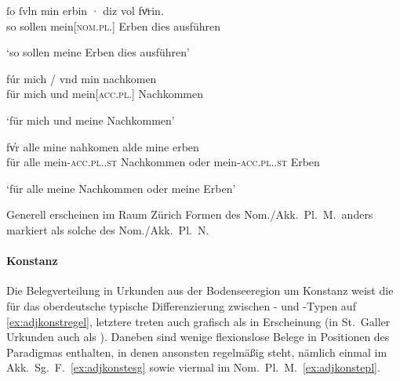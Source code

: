 \begin{exe}
\ex \label{ex:adjzuer0}
	\begin{xlist}
	\ex \label{ex:adjzuer0_1}
		\gll ſo ſvln min erbin · diz {vol fvͦrin.} \\
			so sollen mein[\textsc{nom.pl.\MascA}] Erben {} dies ausführen \\
		\begin{taggedline}{\parencites(Zürich, 1251)[\pno~19,~28.20]{cao1}}
		\trans `so sollen meine Erben dies ausführen'
		\end{taggedline}

	\ex \label{ex:adjzuer0_2}
		\gll fúr mich / vnd min nachkomen \\
			für mich {} und mein[\textsc{acc.pl.\MascA}] Nachkommen \\
		\begin{taggedline}{\parencites(Zürich, 1294)[\pno~2051~A, 278.25--26]{cao3}}
		\trans `für mich und meine Nachkommen'
		\end{taggedline}

	\ex \label{ex:adjzuer0_3}
		\gll fv̓r alle mine nahkomen alde mine erben \\
			für alle mein-\textsc{acc.pl.\MascA.st} Nachkommen oder
				mein-\textsc{acc.pl.\MascA.st} Erben \\
		\begin{taggedline}{\parencites(Eschenbach, Kt.~Luzern, 1294)[\pno~1982,~239.20--21]{cao3}}
		\trans `für alle meine Nachkommen oder meine Erben'
		\end{taggedline}
	\end{xlist}
\end{exe}

Generell erscheinen im Raum Zürich Formen des Nom./Akk.\ Pl.\ M.\ anders
markiert als solche des Nom./Akk.\ Pl.\ N.

\paragraph{Konstanz}
\label{par:adjkonst}
Die Belegverteilung in Urkunden aus der Bodenseeregion um Konstanz weist die
für das oberdeutsche typische Differenzierung zwischen - und
-Typen auf \cref{ex:adjkonstregel}, letztere treten auch grafisch als
 in Erscheinung (in St.~Galler Urkunden auch als ). Daneben
sind wenige flexionslose Belege in Positionen des Paradigmas enthalten, in
denen ansonsten regelmäßig  steht, nämlich einmal im Akk.\ Sg.\ F.\
\cref{ex:adjkonstesg} sowie viermal im Nom.\ Pl.\ M.\ \cref{ex:adjkonstepl}.

